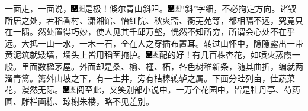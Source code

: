 一面走，一面说，{\includegraphics[width=3mm]{../Images/00003}\includegraphics[width=3mm]{../Images/00012}\footnotesize \kaishu 是极！}倏尔青山斜阻。{\includegraphics[width=3mm]{../Images/00003}\includegraphics[width=3mm]{../Images/00012}\footnotesize \kaishu ``斜''字细，不必拘定方向。诸钗所居之处，若稻香村、潇湘馆、怡红院、秋爽斋、蘅芜苑等，都相隔不远，究竟只在一隅。然处置得巧妙，使人见其千邱万壑，恍然不知所穷，所谓会心处不在乎远。大抵一山一水，一木一石，全在人之穿插布置耳。}转过山怀中，隐隐露出一带黄泥筑就矮墙，墙头上皆用稻茎掩护。{\includegraphics[width=3mm]{../Images/00003}\includegraphics[width=3mm]{../Images/00012}\footnotesize \kaishu 配的好！}有几百株杏花，如喷火蒸霞一般。里面数楹茅屋。外面却是桑、榆、槿、柘，各色树稚新条，随其曲折，编就两溜青篱。篱外山坡之下，有一土井，旁有桔槔辘轳之属。下面分畦列亩，佳蔬菜花，漫然无际。{\includegraphics[width=3mm]{../Images/00003}\includegraphics[width=3mm]{../Images/00012}\footnotesize \kaishu 阅至此，又笑别部小说中，一万个花园中，皆是牡丹亭、芍药圃、雕栏画栋、琼榭朱楼，略不见差别。}

